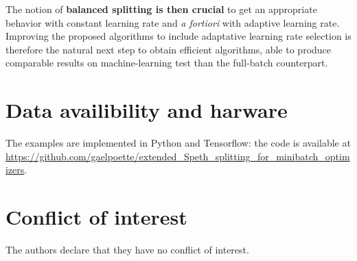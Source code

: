 \documentclass[article,authoryear,jmlmc]{beg_32}             %
\begin{document}
The notion of \textbf{balanced splitting is then crucial} to get an appropriate behavior with constant learning rate and {\em a fortiori} with adaptive learning rate. Improving the
proposed algorithms to include adaptative learning rate selection is therefore the natural next step to obtain efficient algorithms, able to produce comparable results on
machine-learning test than the full-batch counterpart. %



\section*{Data availibility and harware}
The examples are implemented in Python and Tensorflow: the code is available at \url{https://github.com/gaelpoette/extended_Speth_splitting_for_minibatch_optimizers}. 

\section*{Conflict of interest}
The authors declare that they have no conflict of interest.

\newpage

%




\clearpage

\appendix
\end{document}
